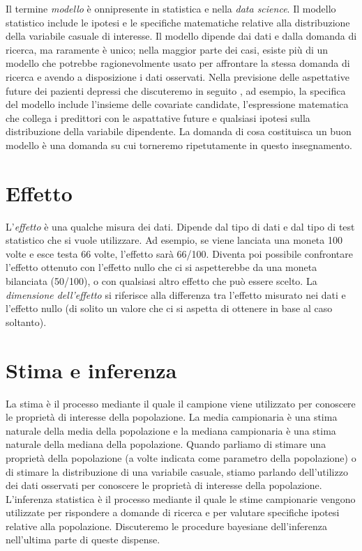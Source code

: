 \documentclass[
  11pt,
]{krantz}
\theoremstyle{definition}
\theoremstyle{definition}
\theoremstyle{definition}
\theoremstyle{definition}
\theoremstyle{remark}
\begin{document}
Il termine \emph{modello} è onnipresente in statistica e nella \emph{data science}. Il modello statistico include le ipotesi e le specifiche matematiche relative alla distribuzione della variabile casuale di interesse. Il modello dipende dai dati e dalla domanda di ricerca, ma raramente è unico; nella maggior parte dei casi, esiste più di un modello che potrebbe ragionevolmente usato per affrontare la stessa domanda di ricerca e avendo a disposizione i dati osservati. Nella previsione delle aspettative future dei pazienti depressi che discuteremo in seguito \citep{zetschefuture2019}, ad esempio, la specifica del modello include l'insieme delle covariate candidate, l'espressione matematica che collega i predittori con le aspattative future e qualsiasi ipotesi sulla distribuzione della variabile dipendente. La domanda di cosa costituisca un buon modello è una domanda su cui torneremo ripetutamente in questo insegnamento.

\hypertarget{effetto}{%
\section{Effetto}\label{effetto}}

L'\emph{effetto} è una qualche misura dei dati. Dipende dal tipo di dati e dal tipo di test statistico che si vuole utilizzare. Ad esempio, se viene lanciata una moneta 100 volte e esce testa 66 volte, l'effetto sarà 66/100. Diventa poi possibile confrontare l'effetto ottenuto con l'effetto nullo che ci si aspetterebbe da una moneta bilanciata (50/100), o con qualsiasi altro effetto che può essere scelto. La \emph{dimensione dell'effetto} si riferisce alla differenza tra l'effetto misurato nei dati e l'effetto nullo (di solito un valore che ci si aspetta di ottenere in base al caso soltanto).

\hypertarget{stima-e-inferenza}{%
\section{Stima e inferenza}\label{stima-e-inferenza}}

La stima è il processo mediante il quale il campione viene utilizzato per conoscere le proprietà di interesse della popolazione. La media campionaria è una stima naturale della media della popolazione e la mediana campionaria è una stima naturale della mediana della popolazione. Quando parliamo di stimare una proprietà della popolazione (a volte indicata come parametro della popolazione) o di stimare la distribuzione di una variabile casuale, stiamo parlando dell'utilizzo dei dati osservati per conoscere le proprietà di interesse della popolazione. L'inferenza statistica è il processo mediante il quale le stime campionarie vengono utilizzate per rispondere a domande di ricerca e per valutare specifiche ipotesi relative alla popolazione. Discuteremo le procedure bayesiane dell'inferenza nell'ultima parte di queste dispense.
\end{document}
